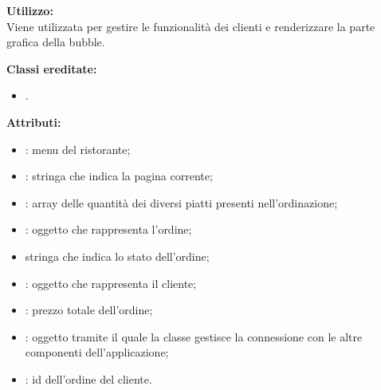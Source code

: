 \textbf{Utilizzo:}\\
Viene utilizzata per gestire le funzionalità dei clienti e renderizzare la parte grafica della bubble.

\textbf{Classi ereditate:}
\begin{itemize}
	\item {}.
\end{itemize}


\textbf{Attributi:}
\begin{itemize}
	\item {}: menu del ristorante;
	\item {}: stringa che indica la pagina corrente;
	\item {}: array delle quantità dei diversi piatti presenti nell'ordinazione;
	\item {}: oggetto che rappresenta l'ordine;
	\item {} stringa che indica lo stato dell'ordine;
	\item {}: oggetto che rappresenta il cliente;
	\item {}: prezzo totale dell'ordine;
	\item {}: oggetto tramite il quale la classe gestisce la connessione con le altre componenti dell'applicazione;
	\item {}: id dell'ordine del cliente.
\end{itemize}

